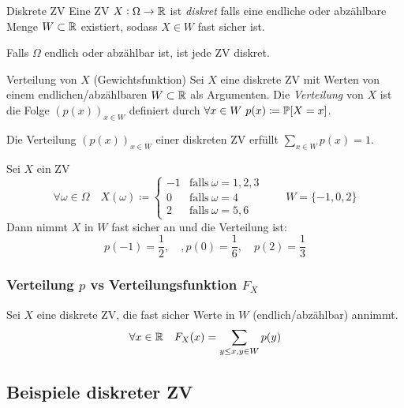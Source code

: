 \begin{definition}{Diskrete ZV}
	Eine ZV $X : \Omega \rightarrow \mathbb{R}$ ist \emph{diskret} falls eine endliche oder abzählbare Menge $W \subset \mathbb{R}$
	existiert, sodass $X \in W$ fast sicher ist.
\end{definition}
Falls $\Omega$ endlich oder abzählbar ist, ist jede ZV diskret.
\begin{definition}{Verteilung von $X$ (Gewichtsfunktion)}
	Sei $X$ eine diskrete ZV mit Werten von einem endlichen/abzählbaren $W \subset \mathbb{R}$ als Argumenten. Die
	\emph{Verteilung} von $X$ ist die Folge $(p(x))_{x \in W}$ definiert durch $ \forall x \in W ~ p(x) \coloneqq \mathbb{P} [X
	= x]$.
\end{definition}
\begin{prop}
	Die Verteilung $(p(x))_{x \in W}$ einer diskreten ZV erfüllt $\sum_{x \in W} p(x) = 1$.
\end{prop}
Sei $X$ ein ZV
\begin{equation*}
	\forall \omega \in \Omega \quad X (\omega) \coloneqq 
	\begin{cases}
		-1 & \text{falls}~\omega = 1,2,3\\
		0 & \text{falls}~\omega = 4\\
		2 & \text{falls}~\omega = 5,6
	\end{cases}
	\qquad
 W = \{-1, 0, 2\}
\end{equation*}
Dann nimmt $X$ in $W$ fast sicher an und die Verteilung ist:
\begin{equation*}
	p (-1) = \frac{1}{2} , \quad , p(0) = \frac{1}{6} , \quad p(2) = \frac{1}{3} 
\end{equation*}

\subsubsection{Verteilung $p$ vs Verteilungsfunktion $F_X$}%
\label{ssub:verteilung_p_vs_verteilungsfunktion_f_x}

\begin{prop}
	Sei $X$ eine diskrete ZV, die fast sicher Werte in $W$ (endlich/abzählbar) annimmt.
	\begin{equation*}
		\forall x \in \mathbb{R} \quad F_X (x) = \sum_{y \leq x, y \in W}  p(y)
	\end{equation*}
\end{prop}


\subsection{Beispiele diskreter ZV}%
\label{sub:beispiele_diskreter_zv}

